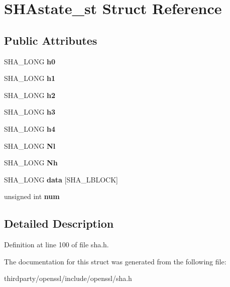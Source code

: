 \hypertarget{struct_s_h_astate__st}{}\section{S\+H\+Astate\+\_\+st Struct Reference}
\label{struct_s_h_astate__st}
\subsection*{Public Attributes}
\begin{DoxyCompactItemize}
\item 
\mbox{\label{struct_s_h_astate__st_ab3041c8fb56553e66f5e96bea583181c}} 
S\+H\+A\+\_\+\+L\+O\+NG {\bfseries h0}
\item 
\mbox{\label{struct_s_h_astate__st_aae63de503961d0e23ec45fadbf762a28}} 
S\+H\+A\+\_\+\+L\+O\+NG {\bfseries h1}
\item 
\mbox{\label{struct_s_h_astate__st_a553b3daa14d04597c861e2482d984761}} 
S\+H\+A\+\_\+\+L\+O\+NG {\bfseries h2}
\item 
\mbox{\label{struct_s_h_astate__st_a5219d68f2bee6867f2775d467691ad24}} 
S\+H\+A\+\_\+\+L\+O\+NG {\bfseries h3}
\item 
\mbox{\label{struct_s_h_astate__st_abd5013d45dc77b9f31df5818e02c80d1}} 
S\+H\+A\+\_\+\+L\+O\+NG {\bfseries h4}
\item 
\mbox{\label{struct_s_h_astate__st_abe78332975c3f20418c6a32381904bba}} 
S\+H\+A\+\_\+\+L\+O\+NG {\bfseries Nl}
\item 
\mbox{\label{struct_s_h_astate__st_aedd943b5d71b31cb22d3a7fecf05575e}} 
S\+H\+A\+\_\+\+L\+O\+NG {\bfseries Nh}
\item 
\mbox{\label{struct_s_h_astate__st_ae8c8b0b2b3c60370a97459696f93e9da}} 
S\+H\+A\+\_\+\+L\+O\+NG {\bfseries data} \mbox{[}S\+H\+A\+\_\+\+L\+B\+L\+O\+CK\mbox{]}
\item 
\mbox{\label{struct_s_h_astate__st_a58f39bf4cf04c1f4796f6df5031bc746}} 
unsigned int {\bfseries num}
\end{DoxyCompactItemize}


\subsection{Detailed Description}


Definition at line 100 of file sha.\+h.



The documentation for this struct was generated from the following file\+:\begin{DoxyCompactItemize}
\item 
thirdparty/openssl/include/openssl/sha.\+h\end{DoxyCompactItemize}
